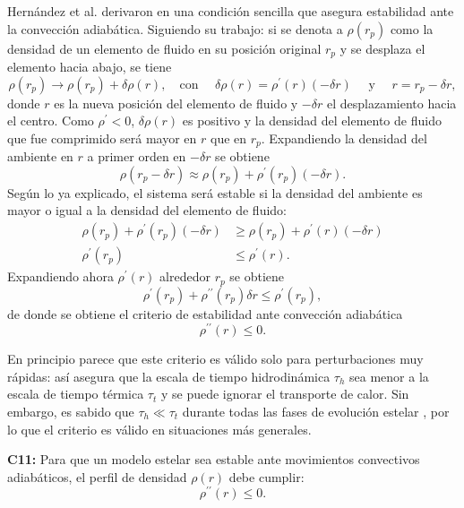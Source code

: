 Hernández et al. derivaron en \cite{Hernandez2018} una condición sencilla que asegura estabilidad ante la convección adiabática. Siguiendo su trabajo: si se denota a $\rho(r_p)$ como la densidad de un elemento de fluido en su posición original $r_p$ y se desplaza el elemento hacia abajo, se tiene
\begin{equation}
    \rho\left(r_{p}\right) \rightarrow \rho\left(r_{p}\right)+\delta \rho(r),\quad \text {con } \quad \delta \rho(r)=\rho^{\prime}(r)(-\delta r) \quad \text { y } \quad r=r_{p}-\delta r,
\end{equation}
donde $r$ es la nueva posición del elemento de fluido y $-\delta r$ el desplazamiento hacia el centro. 
Como $\rho^{\prime} < 0$, $\delta \rho(r)$ es positivo y la densidad del elemento de fluido que fue comprimido será mayor en $r$ que en $r_p$. 
Expandiendo la densidad del ambiente en $r$ a primer orden en $-\delta r$ se obtiene
\begin{equation}
    \rho\left(r_{p}-\delta r\right) \approx \rho\left(r_{p}\right)+\rho^{\prime}\left(r_{p}\right)(-\delta r).
\end{equation}
Según lo ya explicado, el sistema será estable si la densidad del ambiente es mayor o igual a la densidad del elemento de fluido:
\begin{align*}
    \rho\left(r_{p}\right)+\rho^{\prime}\left(r_{p}\right)(-\delta r) &\geq \rho\left(r_{p}\right)+\rho^{\prime}(r)(-\delta r) \\ \rho^{\prime}\left(r_{p}\right) &\leq \rho^{\prime}(r).
\end{align*}
Expandiendo ahora $\rho^{\prime}(r)$ alrededor $r_p$ se obtiene
\begin{equation}
    \rho^{\prime}\left(r_{p}\right)+\rho^{\prime \prime}\left(r_{p}\right) \delta r \leq \rho^{\prime}\left(r_{p}\right),
\end{equation}
de donde se obtiene el criterio de estabilidad ante convección adiabática
\begin{equation}
    \rho^{\prime \prime}(r) \leq 0.
\end{equation}

En principio parece que este criterio es válido solo para perturbaciones muy rápidas: así asegura que la escala de tiempo hidrodinámica $\tau_h$ sea menor a la escala de tiempo térmica $\tau_t$ y se puede ignorar el transporte de calor. Sin embargo, es sabido que $\tau_h \ll \tau_t$ durante todas las fases de evolución estelar \cite{Bisnovatyi-Kogan2011}, por lo que el criterio es válido en situaciones más generales.  

\textbf{C11:} Para que un modelo estelar sea estable ante movimientos convectivos adiabáticos, el perfil de densidad $\rho(r)$ debe cumplir: 
\begin{equation}
    \rho ^ { \prime \prime } ( r ) \leq 0.
\end{equation}